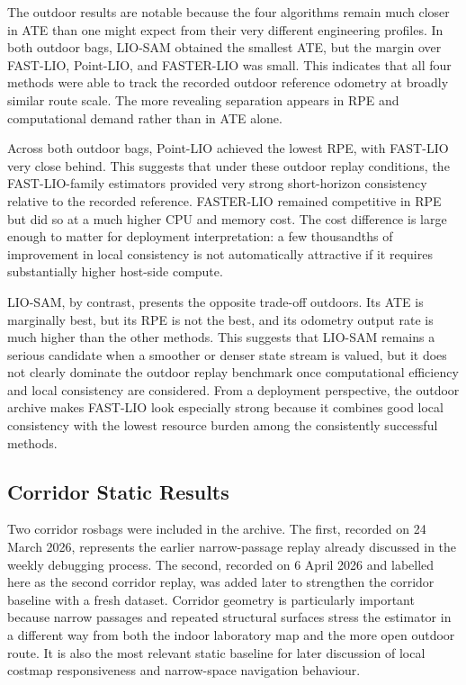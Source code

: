 \documentclass[12pt,a4paper]{report}
\begin{document}
The outdoor results are notable because the four algorithms remain much closer in ATE than one might expect from their very different engineering profiles. In both outdoor bags, LIO-SAM obtained the smallest ATE, but the margin over FAST-LIO, Point-LIO, and FASTER-LIO was small. This indicates that all four methods were able to track the recorded outdoor reference odometry at broadly similar route scale. The more revealing separation appears in RPE and computational demand rather than in ATE alone.

Across both outdoor bags, Point-LIO achieved the lowest RPE, with FAST-LIO very close behind. This suggests that under these outdoor replay conditions, the FAST-LIO-family estimators provided very strong short-horizon consistency relative to the recorded reference. FASTER-LIO remained competitive in RPE but did so at a much higher CPU and memory cost. The cost difference is large enough to matter for deployment interpretation: a few thousandths of improvement in local consistency is not automatically attractive if it requires substantially higher host-side compute.

LIO-SAM, by contrast, presents the opposite trade-off outdoors. Its ATE is marginally best, but its RPE is not the best, and its odometry output rate is much higher than the other methods. This suggests that LIO-SAM remains a serious candidate when a smoother or denser state stream is valued, but it does not clearly dominate the outdoor replay benchmark once computational efficiency and local consistency are considered. From a deployment perspective, the outdoor archive makes FAST-LIO look especially strong because it combines good local consistency with the lowest resource burden among the consistently successful methods.

\subsection{Corridor Static Results}
Two corridor rosbags were included in the archive. The first, recorded on 24 March 2026, represents the earlier narrow-passage replay already discussed in the weekly debugging process. The second, recorded on 6 April 2026 and labelled here as the second corridor replay, was added later to strengthen the corridor baseline with a fresh dataset. Corridor geometry is particularly important because narrow passages and repeated structural surfaces stress the estimator in a different way from both the indoor laboratory map and the more open outdoor route. It is also the most relevant static baseline for later discussion of local costmap responsiveness and narrow-space navigation behaviour.
\end{document}

